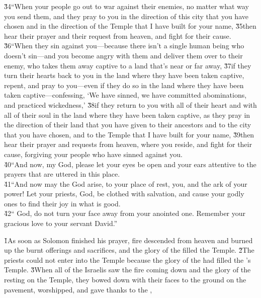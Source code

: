 \begin{poetry}
\poeml \v{34}``When your people go out to war against their enemies, no matter what way you send them, and they pray to you in the direction of this city that you have chosen and in the direction of the Temple that I have built for your name, \v{35}then hear their prayer and their request from heaven, and fight for their cause. \\
\poeml \v{36}``When they sin against you---because there isn't a single human being who doesn't sin---and you become angry with them and deliver them over to their enemy, who takes them away captive to a land that's near or far away, \v{37}if they turn their hearts back to you in the land where they have been taken captive, repent, and pray to you---even if they do so in the land where they have been taken captive---confessing, `We have sinned, we have committed abominations, and practiced wickedness,' \v{38}if they return to you with all of their heart and with all of their soul in the land where they have been taken captive, as they pray in the direction of their land that you have given to their ancestors and to the city that you have chosen, and to the Temple that I have built for your name, \v{39}then hear their prayer and requests from heaven, where you reside, and fight for their cause, forgiving your people who have sinned against you. \\
\poeml \v{40}``And now, my God, please let your eyes be open and your ears attentive to the prayers that are uttered in this place. \\
\poeml \v{41}``And now may the  God arise, to your place of rest, you, and the ark of your power! Let your priests,  God, be clothed with salvation, and cause your godly ones to find their joy in what is good. \\
\poeml \v{42}`` God, do not turn your face away from your anointed one. Remember your gracious love to your servant David.''
\end{poetry}

\v{1}As soon as Solomon finished his prayer, fire descended from heaven and burned up the burnt offerings and sacrifices, and the glory of the  filled the Temple. \v{2}The priests could not enter into the Temple because the glory of the  had filled the 's Temple. \v{3}When all of the Israelis saw the fire coming down and the glory of the  resting on the Temple, they bowed down with their faces to the ground on the pavement, worshipped, and gave thanks to the ,

